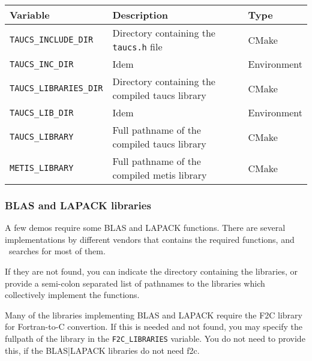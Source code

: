 {\ccTexHtml{\small}{}
\renewcommand{\arraystretch}{1.3}
\gdef\lcTabularBorder{2}
\begin{tabular}{|l|l|l|} \hline
  \textbf{Variable}              & \textbf{Description}                            & \textbf{Type}\\\hline\hline
  \texttt{TAUCS\_INCLUDE\_DIR}   & Directory containing the \texttt{taucs.h} file  & CMake\\\hline
  \texttt{TAUCS\_INC\_DIR}       & Idem                                            & Environment\\\hline
  \texttt{TAUCS\_LIBRARIES\_DIR} & Directory containing the compiled taucs library & CMake\\\hline
  \texttt{TAUCS\_LIB\_DIR}       & Idem                                            & Environment\\\hline
  \texttt{TAUCS\_LIBRARY}        & Full pathname of the compiled taucs library     & CMake\\\hline
  \texttt{METIS\_LIBRARY}        & Full pathname of the compiled metis library     & CMake\\\hline
\end{tabular}
}

\subsubsection{BLAS and LAPACK libraries}

A few demos require some BLAS and LAPACK functions. There are several
implementations by different vendors that contains the required functions,
and \cmake\ searches for most of them.

If they are not found, you can indicate the directory containing the libraries, or provide a
semi-colon separated list of pathnames to the libraries which collectively implement the functions.

Many of the libraries implementing BLAS and LAPACK require the F2C library for Fortran-to-C convertion.
If this is needed and not found, you may specify the fullpath of the library in the \texttt{F2C\_LIBRARIES}
variable. You do not need to provide this, if the BLAS|LAPACK libraries do not need f2c.
 
